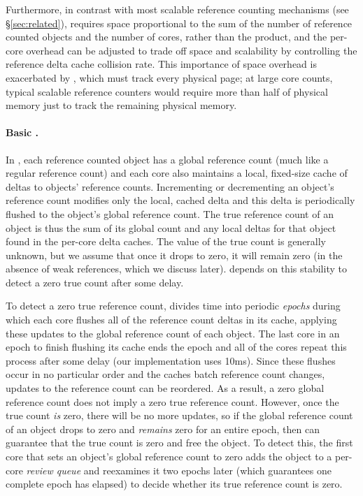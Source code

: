 Furthermore, in contrast with most scalable
reference counting mechanisms (see \S\ref{sec:related}), 
requires space proportional to the sum of the number of reference
counted objects and the number of cores, rather than the product, and
the per-core overhead can be adjusted to trade off space and
scalability by controlling the reference delta cache collision rate.
This importance of space overhead is exacerbated by \vm, which must
track every physical page; at large core counts, typical scalable
reference counters
would require more than half of physical memory just to track the
remaining physical memory.


\paragraph{Basic .}
In , each reference counted object has a global reference
count (much like a regular reference count) and each core also
maintains a local, fixed-size cache of deltas to objects' reference
counts.  Incrementing or decrementing an object's reference count
modifies only the local, cached delta and this delta is periodically
flushed to the object's global reference count.  The true reference
count of an object is thus the sum of its global count and any local
deltas for that object found in the per-core delta caches.  The value of the
true count is generally unknown, but we assume that once it drops to
zero, it will remain zero (in the absence of weak references, which
we discuss later).   depends on this stability to detect a
zero true count after some delay.

To detect a zero true reference count,  divides time into
periodic \emph{epochs} during which each core flushes all of the
reference count deltas in its cache, applying these updates to the
global reference count of each object.  The last core in an epoch to
finish flushing its cache ends the epoch and all of the cores repeat
this process after some delay (our implementation uses 10ms).  Since
these flushes occur in no particular order and the caches batch
reference count changes, updates to the reference count can be
reordered.  As a result, a zero global reference count does not imply
a zero true reference count.  However, once the true count \emph{is}
zero, there will be no more updates, so if the global reference count
of an object drops to zero and \emph{remains} zero for an entire
epoch, then  can guarantee that the true count is zero
and free the object.  To detect this, the first core that sets an object's
global reference count to zero adds the object to a per-core
\emph{review queue} and reexamines it two epochs later (which
guarantees one complete epoch has elapsed) to decide whether its true
reference count is zero.

